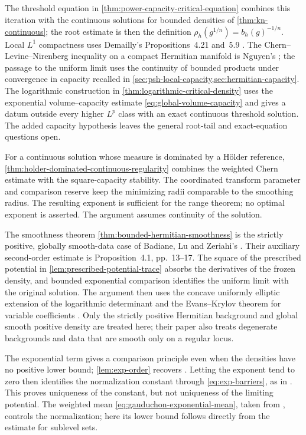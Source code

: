 The threshold equation in \cref{thm:power-capacity-critical-equation} combines this iteration with the continuous solutions for bounded densities of \cref{thm:kn-continuous}; the root estimate is then the definition $\rho_h(g^{1/n})=b_h(g)^{-1/n}$. Local $L^1$ compactness uses Demailly's Propositions~4.21 and~5.9 \cite[Chapter~I, pp.~36--37 and~40]{DemCADG}. The Chern--Levine--Nirenberg inequality on a compact Hermitian manifold is Nguyen's \cite[Proposition~1.1, pp.~245--246]{Nguyen16}; the passage to the uniform limit uses the continuity of bounded products under convergence in capacity recalled in \cref{sec:psh-local-capacity,sec:hermitian-capacity}. The logarithmic construction in \cref{thm:logarithmic-critical-density} uses the exponential volume--capacity estimate \eqref{eq:global-volume-capacity} and gives a datum outside every higher $L^p$ class with an exact continuous threshold solution. The added capacity hypothesis leaves the general root-tail and exact-equation questions open.

For a continuous solution whose measure is dominated by a H\"older reference, \cref{thm:holder-dominated-continuous-regularity} combines the weighted Chern estimate with the square-capacity stability. The coordinated transform parameter and comparison reserve keep the minimizing radii comparable to the smoothing radius. The resulting exponent is sufficient for the range theorem; no optimal exponent is asserted. The argument assumes continuity of the solution.

\label{hist:bounded-hermitian-smoothness}
The smoothness theorem \cref{thm:bounded-hermitian-smoothness} is the strictly positive, globally smooth-data case of Badiane, Lu and Zeriahi's \cite[v1, Theorem~1.1, p.~2; Section~4.2, p.~17]{BLZBoundedSmooth26}. Their auxiliary second-order estimate is Proposition~4.1, pp.~13--17. The square of the prescribed potential in \cref{lem:prescribed-potential-trace} absorbs the derivatives of the frozen density, and bounded exponential comparison identifies the uniform limit with the original solution. The argument then uses the concave uniformly elliptic extension of the logarithmic determinant and the Evans--Krylov theorem for variable coefficients \cite[Definition~3.2, Theorem~3.4, and the paragraph following it, pp.~444--445]{TWWY15}. Only the strictly positive Hermitian background and global smooth positive density are treated here; their paper also treats degenerate backgrounds and data that are smooth only on a regular locus.

The exponential term gives a comparison principle even when the densities have no positive lower bound; \cref{lem:exp-order} recovers \cite[Lemma~2.3, p.~256]{Nguyen16}. Letting the exponent tend to zero then identifies the normalization constant through \eqref{eq:exp-barriers}, as in \cite[Corollary~0.2, p.~242]{Nguyen16}. This proves uniqueness of the constant, but not uniqueness of the limiting potential. The weighted mean \eqref{eq:gauduchon-exponential-mean}, taken from \cite[Proposition~2.5, p.~258]{Nguyen16}, controls the normalization; here its lower bound follows directly from the estimate for sublevel sets.

